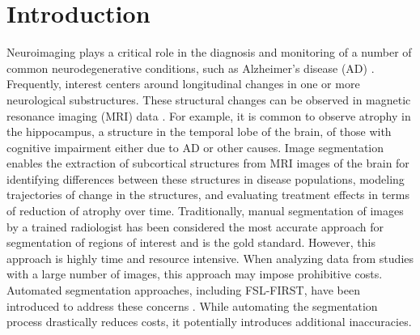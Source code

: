 \documentclass[12pt]{article}
\theoremstyle{definition}
\begin{document}
\section{Introduction}
Neuroimaging plays a critical role in the diagnosis and monitoring of a number of common neurodegenerative conditions, such as Alzheimer's disease (AD) \citep{knopman2021Alzheimer}. Frequently, interest centers around longitudinal changes in one or more neurological substructures. These structural changes can be observed in magnetic resonance imaging (MRI) data \citep{crainiceanu2016tutorial}. For example, it is common to observe atrophy in the hippocampus, a structure in the temporal lobe of the brain, of those with  cognitive impairment either due to AD or other causes. Image segmentation enables the extraction of subcortical structures from MRI images of the brain for identifying differences between these structures in disease populations, modeling trajectories of change in the structures, and evaluating treatment effects in terms of reduction of atrophy over time. Traditionally, manual segmentation of images by a trained radiologist has been considered the most accurate approach for segmentation of regions of interest and is the gold standard. However, this approach is highly time and resource intensive. When analyzing data from studies with a large number of images, this approach may impose prohibitive costs. Automated segmentation approaches, including FSL-FIRST, have been introduced to address these concerns \citep{patenaude2011Bayesian}. While automating the segmentation process drastically reduces costs, it potentially introduces additional inaccuracies.
\end{document}
